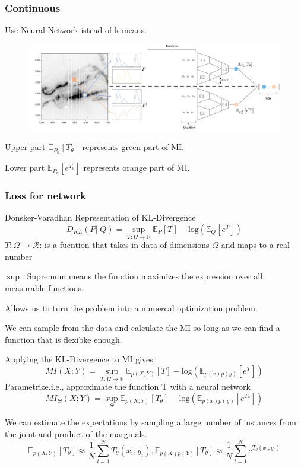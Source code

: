 \subsubsection{Continuous}
Use Neural Network istead of k-means.
\begin{figure}[h!]
    \includegraphics[width = \columnwidth]{figures/XAI3/ContinuousMINE.png}
\end{figure}

Upper part \(\mathbb{E}_{P_n}\left[T_\theta\right]\) represents green part of MI.

Lower part \(\mathbb{E}_{P_n}\left[e^{T_\theta}\right]\) represents orange part of MI.

\subsubsection*{Loss for network}
Donsker-Varadhan Representation of KL-Divergence
\[
D_{KL}(P||Q) = \sup_{T:\Omega \rightarrow \mathbb{R}}\mathbb{E}_P \left[T\right] - \text{log}(\mathbb{E}_Q\left[e^T\right])
\]
\(T:\Omega \rightarrow \mathcal{R}\): is a fucntion that takes in data of dimensions \(\Omega\) and maps to a real number

\(\sup\): Supremum means the function maximizes the expression over all measurable functions.

Allows us to turn the problem into a numercal optimization problem.

We can sample from the data and calculate the MI so long as we can find a function that is flexibke enough.

Applying the KL-Divergence to MI gives:
\[
MI(X;Y) = \sup_{T:\Omega \rightarrow \mathbb{R}}\mathbb{E}_{p(X,Y)} \left[T\right] - \text{log} (\mathbb{E}_{p(x)p(y)}\left[e^{T}\right])
\]
Parametrize,i.e., approximate the function T with a neural network
\[
MI_\Theta(X;Y) = \sup_{\Theta}\mathbb{E}_{p(X,Y)} \left[T_\theta\right] - \text{log} (\mathbb{E}_{p(x)p(y)}\left[e^{T_\theta}\right])
\]

We can estimate the expectations by sampling a large number of instances from the joint and product of the marginals.
\[
\mathbb{E}_{p(X,Y)}\left[T_\theta\right] \approx \frac{1}{N}\sum_{i = 1}^{N} T_\theta (x_i,y_i), \mathbb{E}_{p(X)p(Y)}\left[T_\theta\right] \approx \frac{1}{N}\sum_{i = 1}^{N} e^{T_\theta (x_i,y_i)}
\]

